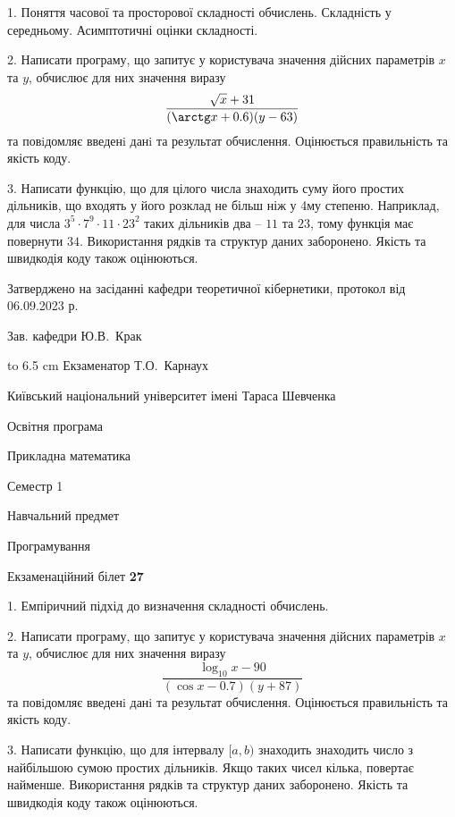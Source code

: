 \documentclass[12pt, ukrainian]{article}
\begin{document}
{%
1. Поняття часової та просторової складності обчислень. Складність у середньому. Асимптотичні оцінки складності.%
\par
2. Написати програму, що запитує у користувача значення дійсних параметрів $x$ та $y$, обчислює для них значення виразу 
$$\frac{\sqrt x + 31}{(\arctg x + 0.6) (y - 63)}$$ 
та повiдомляє введенi данi та результат обчислення.
 Оцінюється правильність та якість коду.

\par
3. Написати функцію, що для цілого числа знаходить суму його простих дільників, що входять у його розклад не більш ніж у 4му степеню. Наприклад, для числа $3^5{\cdot}7^9{\cdot}11{\cdot}23^{2}$ таких дільників два – $11$ та $23$, тому функція має повернути $34$.  Використання рядків та структур даних заборонено. Якість та швидкодія коду також оцінюються. 

}
{\smallskip\smallskip \begin {scriptsize} Затверджено на засіданні кафедри теоретичної кібернетики, протокол   від   06.09.2023 р.\par\smallskip\smallskip\smallskip\smallskip
{\parbox {6.5 cm} {Зав. кафедри \dotfill Ю.В.~Крак}}\hspace {0.7cm} {\hbox to 6.5 cm { Екзаменатор \dotfill Т.О.~Карнаух}} \end{scriptsize}}
\vspace{0.9cm}
{{\begin {scriptsize}\par
{ \center  Київський національний університет імені Тараса Шевченка \par}
{\parbox {5 cm}{Освітня програма \hfill}{\parbox {7 cm}{Прикладна математика\hfill}}\parbox {6 cm}{\hfill Семестр 1}}\par
{\parbox {5 cm} {Навчальний предмет \hfill}\parbox {7 cm}{Програмування \hfill}\parbox {6cm}{\hfill}\par}\vspace{-15pt} \end{scriptsize}}{\center Екзаменаційний білет \No \textbf { 27 }\par}}
{%
1. Емпіричний підхід до визначення складності обчислень.%
\par
2. Написати програму, що запитує у користувача значення дійсних параметрів $x$ та $y$, обчислює для них значення виразу 
$$\frac{\log_{10} x - 90}{(\cos x - 0.7) (y + 87)}$$ 
та повiдомляє введенi данi та результат обчислення.
 Оцінюється правильність та якість коду.

\par
3. Написати функцію, що для інтервалу $[a, b)$ знаходить знаходить число з найбільшою сумою простих дільників. Якщо таких чисел кілька, повертає найменше.  Використання рядків та структур даних заборонено. Якість та швидкодія коду також оцінюються. 

}
\end{document}
